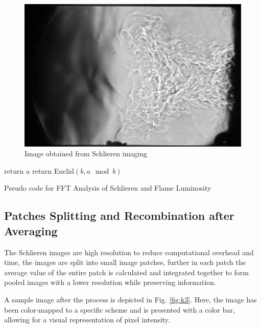\documentclass[conference]{IEEEtran}
\begin{document}
	\begin{figure}[H]
	\includegraphics[scale=.51]{plot/flame.png}
	\caption{Image obtained from Schlieren imaging}\label{fig:k2}
\end{figure}	

\begin{algorithm}






	{
		return $a$\;
	}
	{
		return Euclid$(b,a\mod b)$\;
	}
	\caption{Pseudo code for FFT Analysis of Schlieren and Flame Luminosity}
\end{algorithm}
	
	\subsection{Patches Splitting and Recombination after Averaging}
	The Schlieren images are high resolution to reduce computational overhead and time, the images are split into small image patches, further in each patch the average value of the entire patch is calculated and integrated together to form pooled images with a lower resolution while preserving information.
	
A sample image after the process is depicted in Fig. \ref{fig:k3}. Here, the image has been color-mapped to a specific scheme and is presented with a color bar, allowing for a visual representation of pixel intensity.
	
\end{document}
